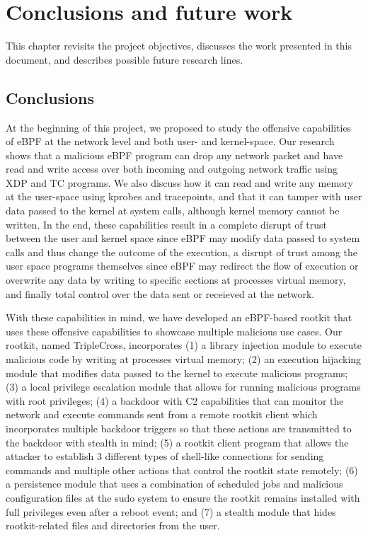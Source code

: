 \chapter{Conclusions and future work}
This chapter revisits the project objectives, discusses the work presented
in this document, and describes possible future research lines.

\section{Conclusions}
At the beginning of this project, we proposed to study the offensive
capabilities of eBPF at the network level and both user- and kernel-space.
Our research shows that a malicious eBPF program can drop any network
packet and have read and write access over both incoming and outgoing
network traffic using XDP and TC programs. We also discuss how it can
read and write any memory at the user-space using kprobes and tracepoints,
and that it can tamper with user data passed to the kernel at system calls,
although kernel memory cannot be written. In the end, these capabilities
result in a complete disrupt of trust between the user and kernel space
since eBPF may modify data passed to system calls and thus change the
outcome of the execution, a disrupt of trust among the user space programs
themselves since eBPF may redirect the flow of execution or overwrite any
data by writing to specific sections at processes virtual memory, and
finally total control over the data sent or receieved at the network.

With these capabilities in mind, we have developed an eBPF-based rootkit
that uses these offensive capabilities to showcase multiple malicious use
cases. Our rootkit, named TripleCross, incorporates (1) a library injection
module to execute malicious code by writing at processes virtual memory;
(2) an execution hijacking module that modifies data passed to the kernel
to execute malicious programs; (3) a local privilege escalation module that
allows for running malicious programs with root privileges; (4) a
backdoor with C2 capabilities that can monitor the network and execute
commands sent from a remote rootkit client which incorporates multiple
backdoor triggers so that these actions are transmitted to the backdoor
with stealth in mind; (5) a rootkit client program that allows the attacker
to establish 3 different types of shell-like connections for sending
commands and multiple other actions that control the rootkit state
remotely; (6) a persistence module that uses a combination of scheduled
jobs and malicious configuration files at the sudo system to ensure the
rootkit remains installed with full privileges even after a reboot event;
and (7) a stealth module that hides rootkit-related files and directories
from the user.

